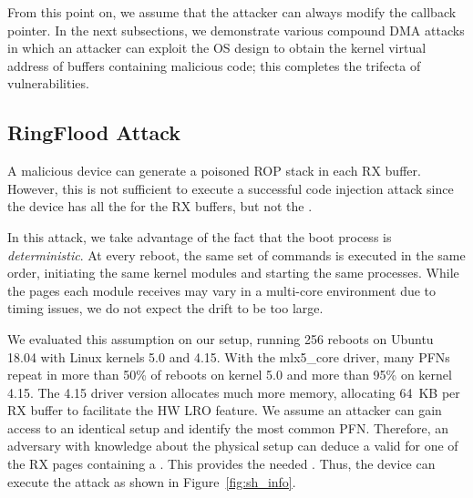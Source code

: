 

From this point on, we assume that the attacker can always modify the callback pointer. In the next subsections, we demonstrate various compound DMA attacks in which an attacker can exploit the OS design to obtain the kernel virtual address of buffers containing malicious code; this completes the trifecta of vulnerabilities.

\subsection{RingFlood \Compound{} Attack}\label{sec:ringflod}
A malicious device can generate a poisoned ROP stack in each RX buffer.
However, this is not sufficient to execute a successful code injection attack since the device has all the \iova{} for the RX buffers, but not the \kva{}.


In this attack, we take advantage of the fact that the boot process is \emph{deterministic}. At every reboot, the same set of commands is executed in the same order, initiating the same kernel modules and starting the same processes. While the pages each module receives may vary in a multi-core environment due to timing issues, we do not expect the drift to be too large. 

We evaluated this assumption on our setup, running 256 reboots on Ubuntu 18.04 with Linux kernels 5.0 and 4.15. With the mlx5\_core driver, many PFNs repeat in more than 50\%  of reboots on kernel 5.0 and more than 95\% on kernel 4.15. The 4.15 driver version allocates much more memory, allocating 64~KB per RX buffer to facilitate the HW LRO feature. We assume an attacker can gain access to an identical setup and identify the most common PFN. Therefore, an adversary with knowledge about the physical setup can deduce a valid \kva{} for one of the RX pages containing a \mabaf. This provides the needed \kva. Thus, the device can execute the attack as shown in Figure~\ref{fig:sh_info}.


